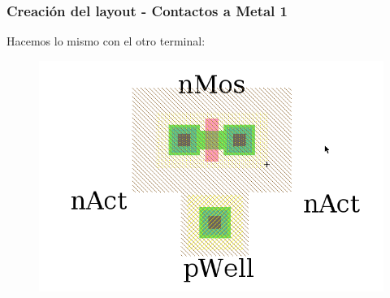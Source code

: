 \documentclass{beamer}
\begin{document}
\begin{frame}
\frametitle{Creación del layout - Contactos a Metal 1}
Hacemos lo mismo con el otro terminal:
\begin{figure}
  \includegraphics[width=0.89\linewidth]{figuras/edicionElectric-8bbbb.png}
\end{figure}
\end{frame}
\end{document}
